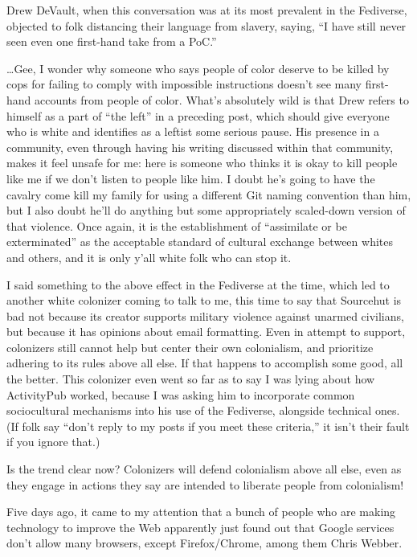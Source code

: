 \documentclass[11pt]{article}
\begin{document}
\begin{itemize}
Drew DeVault, when this conversation was at its most prevalent in the Fediverse, objected to folk distancing their language from slavery, saying, “I have still never seen even one first-hand take from a PoC.”

…Gee, I wonder why someone who says people of color deserve to be killed by cops for failing to comply with impossible instructions doesn’t see many first-hand accounts from people of color. What’s absolutely wild is that Drew refers to himself as a part of “the left” in a preceding post, which should give everyone who is white and identifies as a leftist some serious pause. His presence in a community, even through having his writing discussed within that community, makes it feel unsafe for me: here is someone who thinks it is okay to kill people like me if we don’t listen to people like him. I doubt he’s going to have the cavalry come kill my family for using a different Git naming convention than him, but I also doubt he’ll do anything but some appropriately scaled-down version of that violence. Once again, it is the establishment of “assimilate or be exterminated” as the acceptable standard of cultural exchange between whites and others, and it is only y’all white folk who can stop it.

I said something to the above effect in the Fediverse at the time, which led to another white colonizer coming to talk to me, this time to say that Sourcehut is bad not because its creator supports military violence against unarmed civilians, but because it has opinions about email formatting. Even in attempt to support, colonizers still cannot help but center their own colonialism, and prioritize adhering to its rules above all else. If that happens to accomplish some good, all the better. This colonizer even went so far as to say I was lying about how ActivityPub worked, because I was asking him to incorporate common sociocultural mechanisms into his use of the Fediverse, alongside technical ones. (If folk say “don’t reply to my posts if you meet these criteria,” it isn’t their fault if you ignore that.)

Is the trend clear now? Colonizers will defend colonialism above all else, even as they engage in actions they say are intended to liberate people from colonialism!

Five days ago, it came to my attention that a bunch of people who are making technology to improve the Web apparently just found out that Google services don’t allow many browsers, except Firefox/Chrome, among them Chris Webber.


\end{itemize}
\end{document}
